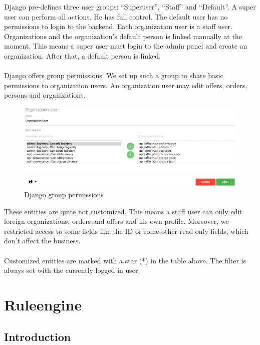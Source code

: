 \documentclass[11pt]{article} %
\begin{document}
 \vspace{0.5cm}
 
 Django pre-defines three user groups: “Superuser”, “Staff” and “Default”. A super user can perform all actions. He has full control. The default user has no permissions to login to the backend. Each organization user is a staff user. Organizations and the organization's default person is linked manually at the moment. This means a super user must login to the admin panel and create an organization. After that, a default person is linked.\\
 \\
Django offers group permissions. We set up such a group to share basic permissions to organization users. An organization user may edit offers, orders, persons and organizations.\\

\begin{figure}[H]
\begin{center}
\includegraphics[width=1.0\textwidth]{group_permissions}
\end{center}
\caption{Django group permissions}
\label{fig:group_permissions}
\end{figure}

These entities are quite not customized. This means a staff user can only edit foreign organizations, orders and offers and his own profile. Moreover, we restricted access to some fields like the ID or some other read only fields, which don’t affect the business.\\
\\
Customized entities are marked with a star (*) in the table above. The filter is always set with the currently logged in user.

\newpage
\section{Ruleengine}
\subsection{Introduction}
\end{document}
